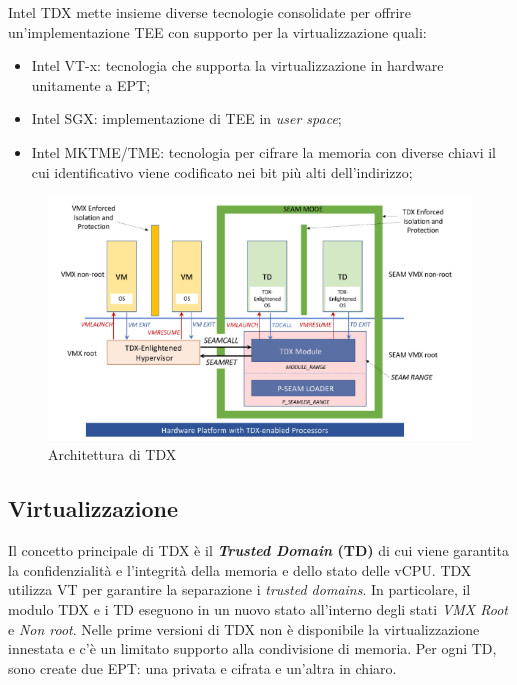 \documentclass{article}
\begin{document}
Intel TDX mette insieme diverse tecnologie consolidate per offrire un'implementazione TEE con supporto per la virtualizzazione\cite{Cheng2024} quali:
\begin{itemize}
  \item Intel VT-x: tecnologia che supporta la virtualizzazione in hardware unitamente a EPT;
  \item Intel SGX: implementazione di TEE in \textit{user space};
  \item Intel MKTME/TME: tecnologia per cifrare la memoria con diverse chiavi il cui identificativo viene codificato nei bit più alti dell'indirizzo;
\end{itemize}

\begin{figure}[h]
  \begin{center}
    \includegraphics[width=.65\textwidth]{figures/tdx-architecture.png}
  \end{center}
  \caption{Architettura di TDX}\label{fig:tdx-architecture}
\end{figure}

\subsection{Virtualizzazione}
Il concetto principale di TDX è il \textbf{\textit{Trusted Domain} (TD)} di cui viene garantita la confidenzialità e l'integrità della memoria e dello stato delle vCPU. TDX utilizza VT per garantire la separazione i \textit{trusted domains}. In particolare, il modulo TDX e i TD eseguono in un nuovo stato all'interno degli stati \textit{VMX Root} e \textit{Non root}. Nelle prime versioni di TDX non è disponibile la virtualizzazione innestata e c'è un limitato supporto alla condivisione di memoria. Per ogni TD, sono create due EPT: una privata e cifrata e un'altra in chiaro.
\end{document}
